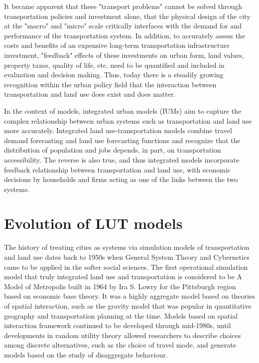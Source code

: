 It became apparent that these "transport problems" cannot be solved through transportation policies and investment alone, that the physical design of the city at the "macro" and "micro" scale critically interfaces with the demand for and performance of the transportation system.
In addition, to accurately assess the costs and benefits of an expensive long-term transportation infrastructure investment, "feedback" effects of these investments on urban form, land values, property taxes, quality of life, etc.
need to be quantified and included in evaluation and decision making.
Thus, today there is a steadily growing recognition within the urban policy field that the interaction between transportation and land use does exist and does matter\cite{Miller2018b}.

In the context of models, integrated urban models (IUMs) aim to capture the complex relationship between urban systems such as transportation and land use more accurately.
Integrated land use-transportation models combine travel demand forecasting and land use forecasting functions and recognize that the distribution of population and jobs depends, in part, on transportation accessibility.
The reverse is also true, and thus integrated models incorporate feedback relationship between transportation and land use, with economic decisions by households and firms acting as one of the links between the two systems\cite{Miller1998}.

\section{Evolution of LUT models} \label{sec:evolution_of_lut_models}

The history of treating cities as systems via simulation models of transportation and land use dates back to 1950s when General System Theory and Cybernetics came to be applied in the softer social sciences\cite{Batty2008}.
The first operational simulation model that truly integrated land use and transportation is considered to be A Model of Metropolis built in 1964 by Ira S. Lowry for the Pittsburgh region based on economic base theory\cite{Lowry1964}.
It was a highly aggregate model based on theories of spatial interaction, such as the gravity model that was popular in quantitative geography and transportation planning at the time\cite{Bouchard1965}.
Models based on spatial interaction framework continued to be developed through mid-1980s, until developments in random utility theory allowed researchers to describe choices among discrete alternatives, such as the choice of travel mode, and generate models based on the study of disaggregate behaviour\cite{Iacono2008}.


